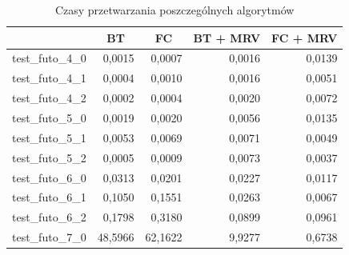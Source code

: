 \documentclass{article}
\begin{document}
	
	\begin{table}[H]
		\caption{Czasy przetwarzania poszczególnych algorytmów}
		\label{tab:times_futo}
		\begin{center}
			\begin{tabular}{|l|r|r|r|r|}
				\hline
				& \multicolumn{1}{c|}{\textbf{BT}} & \multicolumn{1}{c|}{\textbf{FC}} & \multicolumn{1}{c|}{\textbf{BT + MRV}} & \multicolumn{1}{c|}{\textbf{FC + MRV}} \\ \hline
				test\_futo\_4\_0 & 0,0015                           & 0,0007                           & 0,0016                                 & 0,0139                                 \\ \hline
				test\_futo\_4\_1 & 0,0004                           & 0,0010                           & 0,0016                                 & 0,0051                                 \\ \hline
				test\_futo\_4\_2 & 0,0002                           & 0,0004                           & 0,0020                                 & 0,0072                                 \\ \hline
				test\_futo\_5\_0 & 0,0019                           & 0,0020                           & 0,0056                                 & 0,0135                                 \\ \hline
				test\_futo\_5\_1 & 0,0053                           & 0,0069                           & 0,0071                                 & 0,0049                                 \\ \hline
				test\_futo\_5\_2 & 0,0005                           & 0,0009                           & 0,0073                                 & 0,0037                                 \\ \hline
				test\_futo\_6\_0 & 0,0313                           & 0,0201                           & 0,0227                                 & 0,0117                                 \\ \hline
				test\_futo\_6\_1 & 0,1050                           & 0,1551                           & 0,0263                                 & 0,0067                                 \\ \hline
				test\_futo\_6\_2 & 0,1798                           & 0,3180                           & 0,0899                                 & 0,0961                                 \\ \hline
				test\_futo\_7\_0 & 48,5966                          & 62,1622                          & 9,9277                                 & 0,6738                                 \\ \hline

\end{tabular}
\end{center}
\end{table}
\end{document}
